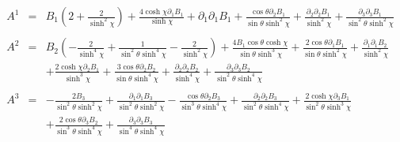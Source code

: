\documentclass[10pt,letterpaper]{article}
\numberwithin{equation}{section}
\begin{document}
\begin{eqnarray}
A^1&=& B_{1} \left(2 + \frac{2}{\sinh^2\chi}\right) + \frac{4 \cosh\chi \partial_{1}B_{1}}{\sinh\chi} + \partial_{1}\partial_{1}B_{1} + \frac{\cos\theta \partial_{2}B_{1}}{\sin\theta \sinh^2\chi} + \frac{\partial_{2}\partial_{2}B_{1}}{\sinh^2\chi} + \frac{\partial_{3}\partial_{3}B_{1}}{\sin^2\theta \sinh^2\chi}
\\  \nonumber\\ 
A^2&=& B_{2} \left(- \frac{2}{\sinh^4\chi} + \frac{1}{\sin^2\theta \sinh^4\chi} -  \frac{2}{\sinh^2\chi}\right) + \frac{4 B_{1} \cos\theta \cosh\chi}{\sin\theta \sinh^3\chi} + \frac{2 \cos\theta \partial_{1}B_{1}}{\sin\theta \sinh^2\chi} + \frac{\partial_{1}\partial_{1}B_{2}}{\sinh^2\chi} \nonumber \\ 
&& + \frac{2 \cosh\chi \partial_{2}B_{1}}{\sinh^3\chi} + \frac{3 \cos\theta \partial_{2}B_{2}}{\sin\theta \sinh^4\chi} + \frac{\partial_{2}\partial_{2}B_{2}}{\sinh^4\chi} + \frac{\partial_{3}\partial_{3}B_{2}}{\sin^2\theta \sinh^4\chi}
\\  \nonumber\\ 
A^3&=& - \frac{2 B_{3}}{\sin^2\theta \sinh^2\chi} + \frac{\partial_{1}\partial_{1}B_{3}}{\sin^2\theta \sinh^2\chi} -  \frac{\cos\theta \partial_{2}B_{3}}{\sin^3\theta \sinh^4\chi} + \frac{\partial_{2}\partial_{2}B_{3}}{\sin^2\theta \sinh^4\chi} + \frac{2 \cosh\chi \partial_{3}B_{1}}{\sin^2\theta \sinh^3\chi} \nonumber \\ 
&& + \frac{2 \cos\theta \partial_{3}B_{2}}{\sin^3\theta \sinh^4\chi} + \frac{\partial_{3}\partial_{3}B_{3}}{\sin^4\theta \sinh^4\chi}
\end{eqnarray}
\end{document}
